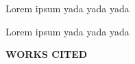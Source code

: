 \documentclass[12pt]{article}
\begin{document}
\par
Lorem ipsum yada yada yada

\par
Lorem ipsum yada yada yada

\noindent \begin{center} {\textbf {WORKS CITED}}\end{center} \par
\end{document}
